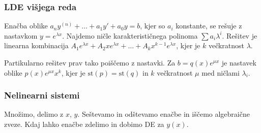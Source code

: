 \documentclass[a4paper,10pt]{article}
\theoremstyle{definition}
\begin{document}
\subsubsection*{LDE višjega reda}
Enačba oblike $a_n y^{(n)} + \dots + a_1 y' + a_0 y = b$, kjer so $a_i$
konstante, se rešuje z nastavkom $y = e^{\lambda x}$. Najdemo ničle
karakterističnega polinoma $\sum a_i \lambda^i$. Rešitev je linearna kombinacija
$A_1e^{\lambda x} + A_2 xe^{\lambda x} + \dots + A_k x^{k-1} e^{\lambda x}$,
kjer je $k$ večkratnost $\lambda$.

Partikularno rešitev prav tako poiščemo z nastavki. Za $b = q(x)e^{\mu x}$ je
nastavek oblike $p(x)e^{\mu x}x^k$, kjer je $\text{st}(p) = \text{st}(q)$ in $k$
večkratnost $\mu$ med ničlami $\lambda_i$.

\subsubsection*{Nelinearni sistemi}
Množimo, delimo z $x$, $y$. Seštevamo in odštevamo enačbe in iščemo algebraične
zveze. Kdaj lahko enačbe zdelimo in dobimo DE za $y(x)$.
\end{document}
